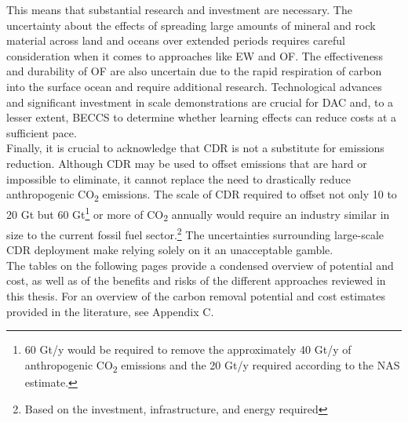 This means that substantial research and investment are necessary. The uncertainty about the effects of spreading large amounts of mineral and rock material across land and oceans over extended periods requires careful consideration when it comes to approaches like EW and OF. The effectiveness and durability of OF are also uncertain due to the rapid respiration of carbon into the surface ocean and require additional research. Technological advances and significant investment in scale demonstrations are crucial for DAC and, to a lesser extent, BECCS to determine whether learning effects can reduce costs at a sufficient pace.\\
Finally, it is crucial to acknowledge that CDR is not a substitute for emissions reduction. Although CDR may be used to offset emissions that are hard or impossible to eliminate, it cannot replace the need to drastically reduce anthropogenic CO\textsubscript{2} emissions. The scale of CDR required to offset not only 10 to 20 Gt but 60 Gt\footnote{60 Gt/y would be required to remove the approximately 40 Gt/y of anthropogenic CO\textsubscript{2} emissions and the 20 Gt/y required according to the NAS estimate.} or more of CO\textsubscript{2} annually would require an industry similar in size to the current fossil fuel sector.\footnote{Based on the investment, infrastructure, and energy required} The uncertainties surrounding large-scale CDR deployment make relying solely on it an unacceptable gamble.
\\The tables on the following pages provide a condensed overview of potential and cost, as well as of the benefits and risks of the different approaches reviewed in this thesis. For an overview of the carbon removal potential and cost estimates provided in the literature, see Appendix C.
\newpage


